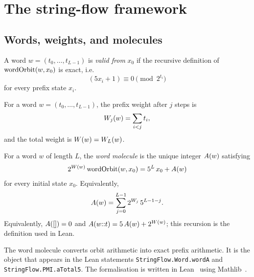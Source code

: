 \section{The string-flow framework}\label{sec:framework}

\subsection{Words, weights, and molecules}

\begin{definition}\label{def:wordValid}
A word $w=(t_0,\dots,t_{L-1})$ is \emph{valid from} $x_0$ if the
recursive definition of $\mathrm{wordOrbit}(w,x_0)$ is exact, i.e.\
\begin{equation*}
  (5x_i+1)\equiv 0 \pmod{2^{t_i}}
\end{equation*}
for every prefix state $x_i$.
\end{definition}

\begin{definition}\label{def:wordWeight}
For a word $w=(t_0,\dots,t_{L-1})$, the prefix weight after $j$ steps
is
\begin{equation*}
  W_j(w)=\sum_{i<j} t_i,
\end{equation*}
and the total weight is $W(w)=W_L(w)$.
\end{definition}

\begin{definition}\label{def:wordA}
For a word $w$ of length $L$, the \emph{word molecule} is the unique
integer $A(w)$ satisfying
\begin{equation*}
  2^{W(w)}\,\mathrm{wordOrbit}(w,x_0)
    = 5^L\,x_0 + A(w)
\end{equation*}
for every initial state $x_0$.  Equivalently,
\begin{equation*}
  A(w)=\sum_{j=0}^{L-1}
    2^{W_j}\,5^{L-1-j}.
\end{equation*}
Equivalently, \(A([])=0\) and
\(A(w{::}t)=5\,A(w)+2^{W(w)}\);
this recursion is the definition used in Lean.
\end{definition}

The word molecule converts orbit arithmetic into exact prefix
arithmetic.  It is the object that appears in the Lean statements
\texttt{StringFlow.Word.wordA} and \texttt{StringFlow.PMI.aTotal5}.
The formalisation is written in Lean~\cite{lean} using
Mathlib~\cite{mathlib}.

